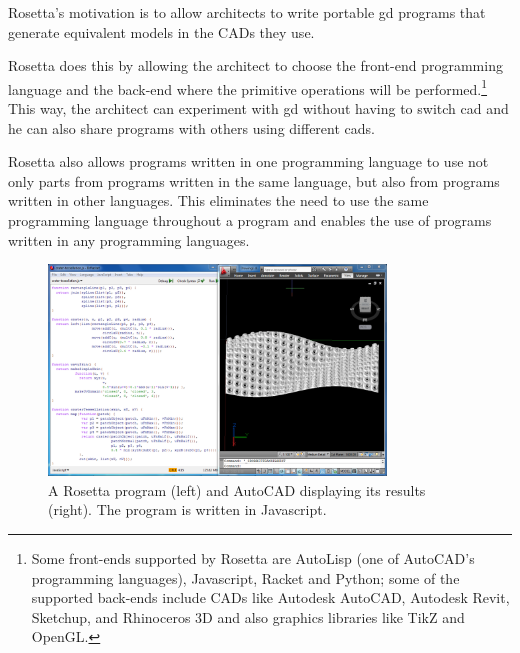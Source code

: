 Rosetta's motivation is to allow architects to write portable \gls{gd} programs that generate equivalent models in the CADs they use.

Rosetta does this by allowing the architect to choose the front-end programming language and the back-end where the primitive operations will be performed.\footnote{Some front-ends supported by Rosetta are AutoLisp (one of AutoCAD's programming languages), Javascript, Racket and Python; some of the supported back-ends include CADs like Autodesk AutoCAD, Autodesk Revit, Sketchup, and Rhinoceros 3D and also graphics libraries like TikZ and OpenGL.}
This way, the architect can experiment with \gls{gd} without having to switch \gls{cad} and he can also share programs with others using different \glspl{cad}.

Rosetta also allows programs written in one programming language to use not only parts from programs written in the same language, but also from programs written in other languages.
This eliminates the need to use the same programming language throughout a program and enables the use of programs written in any programming languages.

\begin{figure}
	\centering
	\includegraphics[width=0.8\textwidth]{images/rosetta_js_autocad}
	\caption{A Rosetta program (left) and AutoCAD displaying its results (right). The program is written in Javascript.}
	\label{fig:rosetta:ex}
\end{figure}
